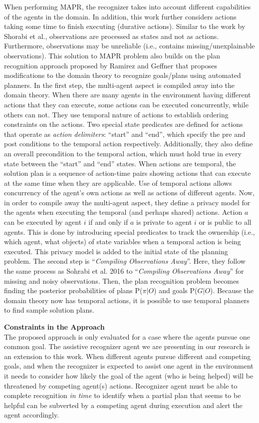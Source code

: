 When performing MAPR, the recognizer takes into account different capabilities of the agents in the domain. In addition, this work further considers actions taking some time to finish executing (durative actions). Similar to the work by Shorabi et al., observations are processed as states and not as actions. Furthermore, observations may be unreliable (i.e., contains missing/unexplainable observations). This solution to MAPR problem also builds on the plan recognition approach proposed by Ramirez and Geffner that proposes modifications to the domain theory to recognize goals/plans using automated planners. In the first step, the multi-agent aspect is compiled away into the domain theory. When there are many agents in the environment having different actions that they can execute, some actions can be executed concurrently, while others can not. They use temporal nature of actions to establish ordering constraints on the actions.  Two special state predicates are defined for actions that operate as \textit{action delimiters}: ``start'' and ``end'', which specify the pre and post conditions to the temporal action respectively. Additionally, they also define an overall precondition to the temporal action, which must hold true in every state between the ``start'' and ``end'' states. When actions are temporal, the solution plan is a sequence of action-time pairs showing actions that can execute at the same time when they are applicable.  Use of temporal actions allows concurrency of the agent's own actions as well as actions of different agents. Now, in order to compile away the multi-agent aspect, they define a privacy model for the agents when executing the temporal (and perhaps shared) actions. Action $a$ can be executed by agent $i$ if and only if $a$ is private to agent $i$ or is public to all agents. This is done by introducing special predicates to track the ownership (i.e., which agent, what objects) of state variables when a temporal action is being executed. This privacy model is added to the initial state of the planning problem. The second step is ``\textit{Compiling Observations Away}''. Here, they follow the same process as Sohrabi et al. 2016 to ``\textit{Compiling Observations Away}'' for missing and noisy observations. Then, the plan recognition problem becomes finding the posterior probabilities of plans P($\pi|O$) and  goals P($G|O$). Because the domain theory now has temporal actions, it is possible to use temporal planners to find sample solution plans.

\noindent\textbf{Constraints in the Approach}\\
The proposed approach is only evaluated for a case where the agents pursue one common goal. The assistive recognizer agent we are presenting in our research is an extension to this work. When different agents pursue different and competing goals, and when the recognizer is expected to assist one agent in the environment it needs to consider how likely the goal of the agent (who is being helped) will be threatened by competing agent(s) actions. Recognizer agent must be  able to complete recognition \textit{in time} to identify when a partial plan that seems to be helpful can be subverted by a competing agent during execution and alert the agent accordingly.



